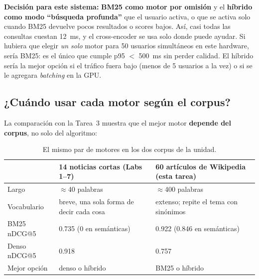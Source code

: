 \documentclass[11pt,letterpaper]{article}
\begin{document}
\textbf{Decisión para este sistema:} \textbf{BM25 como motor por omisión} y el \textbf{híbrido como modo ``búsqueda profunda''} que el usuario activa, o que se activa solo cuando BM25 devuelve pocos resultados o scores bajos. Así, casi todas las consultas cuestan 12~ms, y el cross-encoder se usa solo donde puede ayudar. Si hubiera que elegir \emph{un solo} motor para 50 usuarios simultáneos en este hardware, sería BM25: es el único que cumple p95 $<$ 500~ms sin perder calidad. El híbrido sería la mejor opción si el tráfico fuera bajo (menos de 5 usuarios a la vez) o si se le agregara \emph{batching} en la GPU.

\subsection{¿Cuándo usar cada motor según el corpus?}

La comparación con la Tarea~3 muestra que el mejor motor \textbf{depende del corpus}, no solo del algoritmo:

\begin{table}[H]
\centering
\small
\caption{El mismo par de motores en los dos corpus de la unidad.}
\label{tab:corpus2}
\begin{tabularx}{\linewidth}{lXX}
\toprule
 & 14 noticias cortas (Labs 1--7) & 60 artículos de Wikipedia (esta tarea) \\
\midrule
Largo & $\approx$40 palabras & $\approx$400 palabras \\
Vocabulario & breve, una sola forma de decir cada cosa & extenso; repite el tema con sinónimos \\
BM25 nDCG@5 & 0.735 (0 en semánticas) & 0.922 (0.846 en semánticas) \\
Denso nDCG@5 & 0.918 & 0.757 \\
Mejor opción & denso o híbrido & BM25 o híbrido \\
\bottomrule
\end{tabularx}
\end{table}
\end{document}
